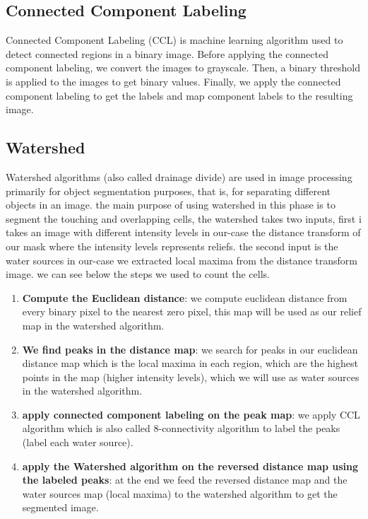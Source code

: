 \subsection{Connected Component Labeling}
Connected Component Labeling (CCL) is machine learning algorithm used to detect connected regions in a binary image.
Before applying the connected component labeling, we convert the images to grayscale. Then, a binary threshold is applied to the images to get binary values.
Finally, we apply the connected component labeling to get the labels and map component labels to the resulting image.

\subsection{Watershed}
Watershed algorithms (also called drainage divide) are used in image processing primarily for object segmentation purposes, that is, for separating different objects in an image. the main purpose of using watershed in this phase is to segment the touching and overlapping cells, the watershed takes two inputs, first i takes an image with different intensity levels in our-case the distance transform of our mask where the intensity levels represents reliefs. the second input is the water sources in our-case we extracted local maxima from the distance transform image. we can see below the steps we used to count the cells.

\begin{enumerate}
    \item \textbf{Compute the Euclidean distance}: we compute euclidean distance from every binary pixel to the nearest zero pixel, this map will be used as our relief map in the watershed algorithm.
    \item \textbf{We find peaks in the distance map}: we search for peaks in our euclidean distance map which is the local maxima in each region, which are the highest points in the map (higher intensity levels), which we will use as water sources in the watershed algorithm.
    \item \textbf{apply connected component labeling on the peak map}: we apply CCL algorithm which is also called 8-connectivity algorithm to label the peaks (label each water source).
    \item \textbf{apply the Watershed algorithm on the reversed distance map using the labeled peaks}: at the end we feed the reversed distance map and the water sources map (local maxima) to the watershed algorithm to get the segmented image. 
\end{enumerate}

